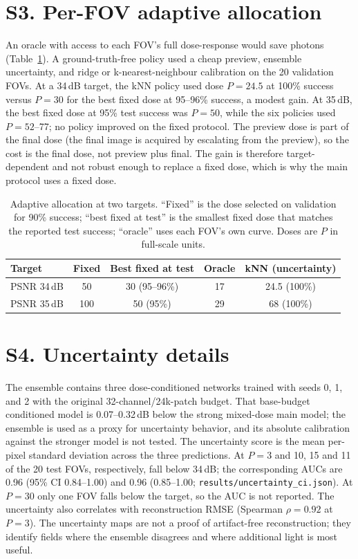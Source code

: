 \documentclass[11pt]{article}
\begin{document}
\section*{S3. Per-FOV adaptive allocation}
An oracle with access to each FOV's full dose-response would save photons
(Table~\ref{tab:adaptive}). A ground-truth-free policy used a cheap preview,
ensemble uncertainty, and ridge or k-nearest-neighbour calibration on the 20
validation FOVs. At a 34\,dB target, the kNN policy used dose $P=24.5$ at 100\%
success versus $P=30$ for the best fixed dose at 95--96\% success, a
modest gain. At 35\,dB, the best fixed dose at 95\% test success was $P=50$,
while the six policies used $P=52$--77; no policy improved on the fixed
protocol. The preview dose is part of the final dose (the final image is
acquired by escalating from the preview), so the cost is the final dose, not
preview plus final. The gain is therefore target-dependent and not robust
enough to replace a fixed dose, which is why the main protocol uses a fixed
dose.

\begin{table}[h]
\centering
\caption{Adaptive allocation at two targets. ``Fixed'' is the dose selected on
validation for 90\% success; ``best fixed at test'' is the smallest fixed dose
that matches the reported test success; ``oracle'' uses each FOV's own curve.
Doses are $P$ in full-scale units.}
\label{tab:adaptive}
\begin{tabular}{lcccc}
\toprule
Target & Fixed & Best fixed at test & Oracle & kNN (uncertainty) \\
\midrule
PSNR 34\,dB & 50 & 30 (95--96\%) & 17 & 24.5 (100\%) \\
PSNR 35\,dB & 100 & 50 (95\%) & 29 & 68 (100\%) \\
\bottomrule
\end{tabular}
\end{table}

\section*{S4. Uncertainty details}
The ensemble contains three dose-conditioned networks trained with seeds 0, 1,
and 2 with the original 32-channel/24k-patch budget. That base-budget
conditioned model is 0.07--0.32\,dB below the strong mixed-dose main model; the
ensemble is used as a proxy for uncertainty behavior, and its absolute
calibration against the stronger model is not tested. The uncertainty score is the mean per-pixel standard deviation across
the three predictions. At $P=3$ and 10, 15 and 11 of the 20 test FOVs,
respectively, fall below 34\,dB; the corresponding AUCs are 0.96 (95\% CI
0.84--1.00) and 0.96 (0.85--1.00; \texttt{results/uncertainty\_ci.json}). At
$P=30$ only one FOV falls below the target, so the AUC is not reported. The
uncertainty also correlates with reconstruction RMSE (Spearman $\rho=0.92$ at
$P=3$). The uncertainty maps are not a proof of artifact-free reconstruction;
they identify fields where the ensemble disagrees and where additional light is
most useful.
\end{document}
